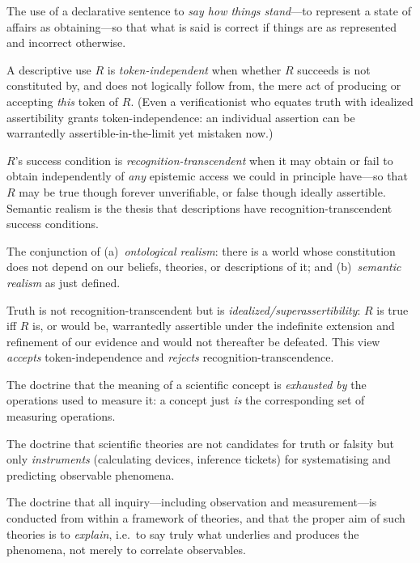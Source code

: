 \documentclass[12pt]{article}
\begin{document}
\begin{description}[leftmargin=1.6em,style=nextline]
\item[Descriptive (representative) use of language.] The use of a
declarative sentence to \emph{say how things stand}---to represent a
state of affairs as obtaining---so that what is said is correct if things
are as represented and incorrect otherwise.
\item[Token-independence of a success condition.] A descriptive use $R$
is \emph{token-independent} when whether $R$ succeeds is not constituted
by, and does not logically follow from, the mere act of producing or
accepting \emph{this} token of $R$. (Even a verificationist who equates
truth with idealized assertibility grants token-independence: an
individual assertion can be warrantedly assertible-in-the-limit yet
mistaken now.)
\item[Recognition-transcendence (semantic realism).] $R$'s success
condition is \emph{recognition-transcendent} when it may obtain or fail
to obtain independently of \emph{any} epistemic access we could in
principle have---so that $R$ may be true though forever unverifiable, or
false though ideally assertible. Semantic realism is the thesis that
descriptions have recognition-transcendent success conditions.
\item[Realism.] The conjunction of (a)~\emph{ontological realism}: there
is a world whose constitution does not depend on our beliefs, theories,
or descriptions of it; and (b)~\emph{semantic realism} as just defined.
\item[Sophisticated anti-realism (Dummett).] Truth is not
recognition-transcendent but is \emph{idealized/superassertibility}: $R$
is true iff $R$ is, or would be, warrantedly assertible under the
indefinite extension and refinement of our evidence and would not
thereafter be defeated. This view \emph{accepts} token-independence and
\emph{rejects} recognition-transcendence.
\item[Operationalism.] The doctrine that the meaning of a scientific
concept is \emph{exhausted by} the operations used to measure it: a
concept just \emph{is} the corresponding set of measuring operations.
\item[Instrumentalism.] The doctrine that scientific theories are not
candidates for truth or falsity but only \emph{instruments} (calculating
devices, inference tickets) for systematising and predicting observable
phenomena.
\item[Theoreticism.] The doctrine that all inquiry---including
observation and measurement---is conducted from within a framework of
theories, and that the proper aim of such theories is to \emph{explain},
i.e.\ to say truly what underlies and produces the phenomena, not merely
to correlate observables.
\end{description}
\end{document}
